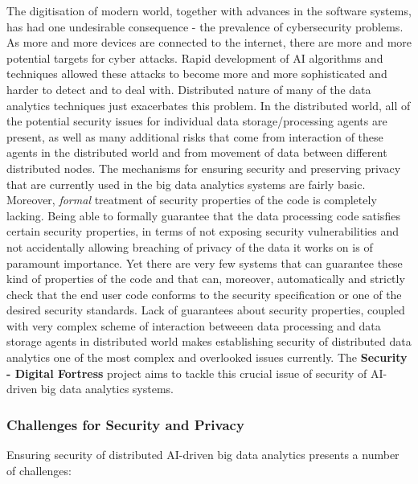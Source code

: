 \documentclass[a4paper,11pt]{article}
\newcommand{\project}[1]{\textbf{#1}\xspace}
\newcommand{\SECURITY}{\project{Security - Digital Fortress}}
\newcommand{\TheProject}{\SECURITY}
\begin{document}
The digitisation of modern world, together with advances in the software systems, has had one undesirable consequence - the prevalence of cybersecurity problems. As more and more devices are connected to the internet, there are more and more potential targets for cyber attacks. Rapid development of AI algorithms and techniques allowed these attacks to become more and more sophisticated and harder to detect and to deal with. Distributed nature of many of the data analytics techniques just exacerbates this problem. In the distributed world, all of the potential security issues for individual data storage/processing agents are present, as well as many additional risks that come from interaction of these agents in the distributed world and from movement of data between different distributed nodes. The mechanisms for ensuring security and preserving privacy that are currently used in the big data analytics systems are fairly basic. Moreover, \emph{formal} treatment of security properties of the code is completely lacking. Being able to formally guarantee that the data processing code satisfies certain security properties, in terms of not exposing security vulnerabilities and not accidentally allowing breaching of privacy of the data it works on is of paramount importance. Yet there are very few systems that can guarantee these kind of properties of the code and that can, moreover, automatically and strictly check that the end user code conforms to the security specification or one of the desired security standards. Lack of guarantees about security properties, coupled with very complex scheme of interaction betweeen data processing and data storage agents in distributed world makes establishing security of distributed data analytics one of the most complex and overlooked issues currently. The \TheProject{} project aims to tackle this crucial issue of security of AI-driven big data analytics systems.




\subsubsection{Challenges for Security and Privacy}

Ensuring security of distributed AI-driven big data analytics presents a number of challenges:
\end{document}
